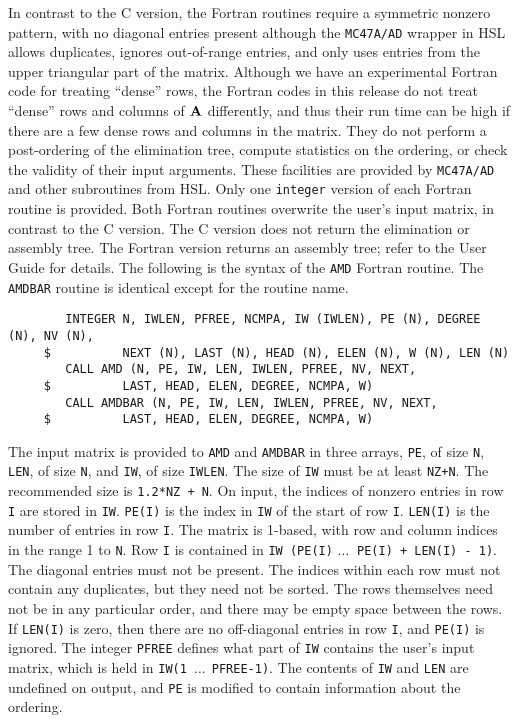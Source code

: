 \documentclass[11pt]{article}
\newcommand{\m}[1]{{\bf{#1}}}       %
\begin{document}
In contrast to the C version, the Fortran routines require a symmetric
nonzero pattern, with no diagonal entries present although the {\tt MC47A/AD}
wrapper in HSL allows duplicates, ignores out-of-range entries, and only
uses entries from the upper triangular part of the matrix.  Although we
have an experimental Fortran code for treating ``dense'' rows, the Fortran
codes in this release do not treat
``dense'' rows and columns of $\m{A}$ differently, and thus their run time
can be high if there are a few dense rows and columns in the matrix.
They do not perform a post-ordering of the elimination tree,
compute statistics on the ordering, or check the validity of their input
arguments. These facilities are provided by {\tt MC47A/AD} and other
subroutines from HSL.
Only one {\tt integer}
version of each Fortran routine is provided.  
Both Fortran routines overwrite the user's input
matrix, in contrast to the C version.  
%
The C version does not return the elimination or assembly tree.
The Fortran version returns an assembly tree;
refer to the User Guide for details.
The following is the syntax of the {\tt AMD} Fortran routine.
The {\tt AMDBAR} routine is identical except for the routine name.

{\footnotesize
\begin{verbatim}
        INTEGER N, IWLEN, PFREE, NCMPA, IW (IWLEN), PE (N), DEGREE (N), NV (N),
     $          NEXT (N), LAST (N), HEAD (N), ELEN (N), W (N), LEN (N)
        CALL AMD (N, PE, IW, LEN, IWLEN, PFREE, NV, NEXT,
     $          LAST, HEAD, ELEN, DEGREE, NCMPA, W)
        CALL AMDBAR (N, PE, IW, LEN, IWLEN, PFREE, NV, NEXT,
     $          LAST, HEAD, ELEN, DEGREE, NCMPA, W)
\end{verbatim}
}

The input matrix is provided to {\tt AMD} and {\tt AMDBAR}
in three arrays, {\tt PE}, of size {\tt N},
{\tt LEN}, of size {\tt N}, and {\tt IW}, of size {\tt IWLEN}.  The size of
{\tt IW} must be at least {\tt NZ+N}.  The recommended size is
{\tt 1.2*NZ + N}.
On input, the indices of nonzero entries in row {\tt I} are stored in {\tt IW}.
{\tt PE(I)} is the index in {\tt IW} of the start of row {\tt I}.
{\tt LEN(I)} is the number of entries in row {\tt I}.
The matrix is 1-based, with row and column indices in the range 1 to {\tt N}.
Row {\tt I} is contained in
{\tt IW (PE(I)} $\ldots \:$ {\tt PE(I) + LEN(I) - 1)}.
The diagonal entries must not be present.  The indices within each row must
not contain any duplicates, but they need not be sorted.  The rows
themselves need not be in any particular order, and there may be empty space
between the rows.  If {\tt LEN(I)} is zero, then there are no off-diagonal
entries in row {\tt I}, and {\tt PE(I)} is ignored.  The integer
{\tt PFREE} defines what part of {\tt IW} contains the user's input matrix,
which is held in {\tt IW(1}~$\ldots~\:${\tt PFREE-1)}.
The contents of {\tt IW} and {\tt LEN} are undefined on output,
and {\tt PE} is modified to contain information about the ordering.
\end{document}
